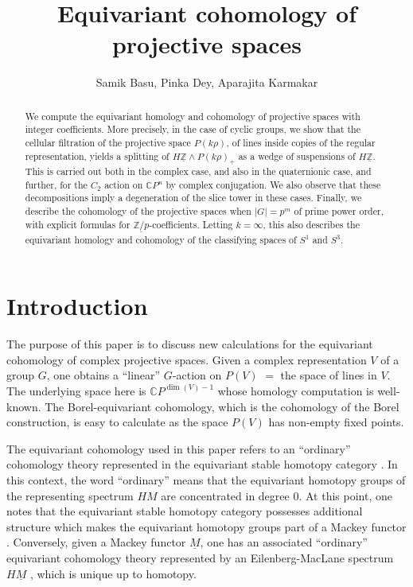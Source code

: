 \documentclass[a4paper,leqno,11pt]{amsart}
\title[]{Equivariant cohomology of projective spaces}
\author{Samik Basu, Pinka Dey, Aparajita Karmakar}
\theoremstyle{plain}
\theoremstyle{definition}
\theoremstyle{remark}
\theoremstyle{definition}
\newcommand{\C}{{\mathbb C}}
\newcommand{\Z}{{\mathbb{Z}}}
\newcommand{\uZp}{\underline{\Z/p}}
\newcommand{\uM}{\underline{M}}
\newcommand{\uZ}{\underline{\mathbb{Z}}}
\def\Z{\mathbb{Z}}
\def\C{\mathbb{C}}
\numberwithin{equation}{section}
\begin{document}
	\begin{abstract}
We compute the equivariant homology and cohomology of projective spaces with integer coefficients. More precisely, in the case of cyclic groups, we show that the cellular filtration of the projective space $P(k\rho)$, of lines inside copies of the regular representation, yields a splitting of $H\uZ\wedge P(k\rho)_+$ as a wedge of suspensions of $H\uZ$. This is carried out both in the complex case, and also in the quaternionic case, and further, for the $C_2$ action on $\C P^n$ by complex conjugation. We also observe that these decompositions imply a degeneration of the slice tower in these cases. Finally, we describe the cohomology of the projective spaces when $|G|=p^m$ of prime power order, with explicit formulas for $\uZp$-coefficients. Letting $k=\infty$, this also describes the equivariant homology and cohomology of the classifying spaces of $S^1$ and $S^3$. 
	\end{abstract}
	\maketitle

	\section{Introduction}
	The purpose of this paper is to discuss new calculations for the equivariant cohomology of complex projective spaces. Given a complex representation $V$ of a group $G$, one obtains a ``linear'' $G$-action on $P(V)$ $=$ the space of lines in $V$. The underlying space here is $\C P^{\dim(V)-1}$ whose homology computation is well-known.  The Borel-equivariant cohomology, which is the cohomology of the Borel construction, is easy to calculate as the space $P(V)$ has non-empty fixed points. 
	
	The equivariant cohomology used in this paper refers to an ``ordinary'' cohomology theory represented in the equivariant stable homotopy category \cite[Ch. XIII \S 4]{May-EquivBook}.  In this context, the word ``ordinary'' means that the equivariant homotopy groups of the representing spectrum $HM$  are concentrated in degree $0$. At this point, one notes that the equivariant stable homotopy category possesses additional structure which makes the equivariant homotopy groups part of a Mackey functor \cite[Ch. IX \S 4]{May-EquivBook}. Conversely, given a Mackey functor $\uM$, one has an associated ``ordinary'' equivariant cohomology  theory represented by an Eilenberg-MacLane spectrum $H\uM$ \cite[Theorem 5.3]{GreenleesMay}, which is unique up to homotopy.
	
\end{document}
